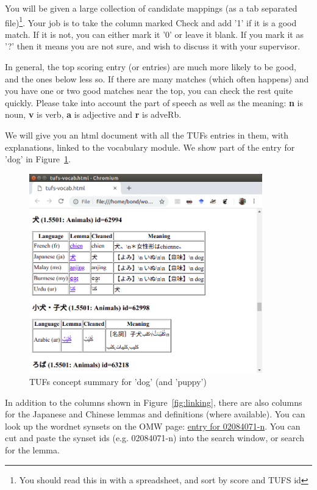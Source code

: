 \documentclass[11pt]{article}
\begin{document}
You will be given a large collection of candidate mappings (as a tab
separated file)\footnote{You should read this in with a spreadsheet,
  and sort by score and TUFS id}.  Your job
is to take the column marked Check and add '1' if it is a good match.
If it is not, you can either mark it '0' or leave it blank.  If you
mark it as '?' then it means you are not sure, and wish to discuss it
with your supervisor.    


In general, the top scoring entry (or entries) are much more likely to
be good, and the ones below less so.  If there are many matches (which
often happens) and you have one or two good matches near the top, you
can check the rest quite quickly.  Please take into account the part
of speech as well as the meaning: \textbf{n} is noun, \textbf{v} is
verb, \textbf{a} is adjective and \textbf{r} is adveRb.



We will give you an html document with all the TUFs entries in them,
with explanations, linked to the vocabulary module.  We show part of the entry
for 'dog' in Figure~\ref{fig:tufs-inu}.

\begin{figure}[htpb]
  \centering
  \includegraphics[width=0.9\textwidth]{inu-html.png}
  \caption{TUFs concept summary for 'dog' (and 'puppy')}
  \label{fig:tufs-inu}
\end{figure}

In addition to the columns shown in Figure~\ref{fig:linking}, there
are also columns for the Japanese and Chinese lemmas and definitions
(where available).  You can look up the wordnet synsets on the OMW
page:
\href{http://compling.hss.ntu.edu.sg/omw/cgi-bin/wn-grid.cgi?usrname=&gridmode=gridx&synset=02084071-n&lang=eng&lang2=eng}{entry
  for 02084071-n}.  You can cut and paste the synset ids
(e.g. 02084071-n) into the search window, or search for the lemma.
\end{document}

